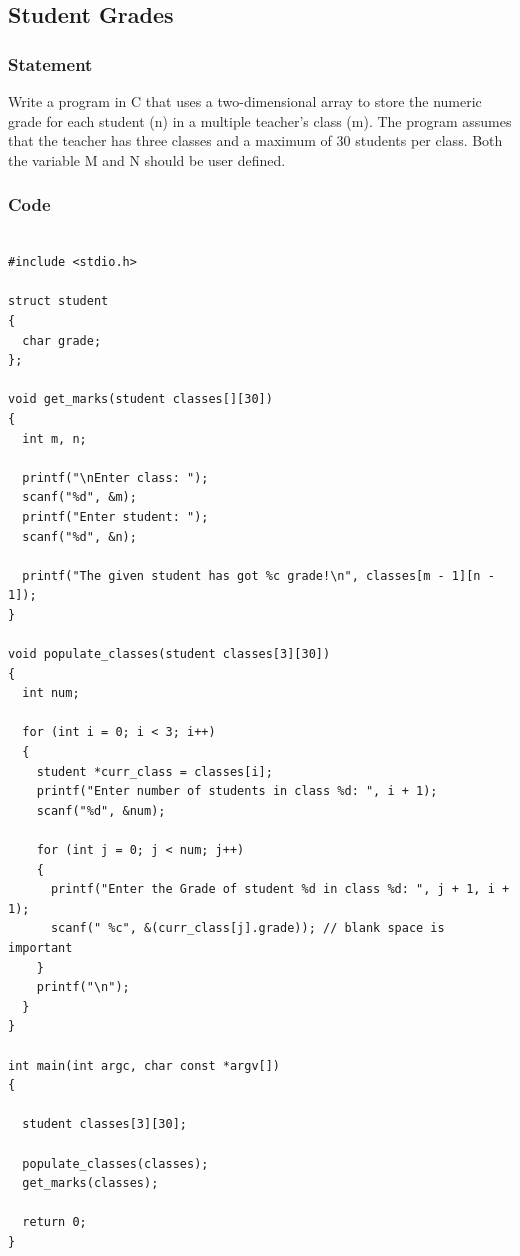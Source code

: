 \subsection{Student Grades}

\subsubsection{Statement}
Write a program in C that uses a two-dimensional array to store the numeric grade for
each student (n) in a multiple teacher’s class (m). The program assumes that the teacher has three
classes and a maximum of 30 students per class. Both the variable M and N should be user
defined.

\subsubsection{Code}
\begin{verbatim} 
 
#include <stdio.h>

struct student
{
  char grade;
};

void get_marks(student classes[][30])
{
  int m, n;

  printf("\nEnter class: ");
  scanf("%d", &m);
  printf("Enter student: ");
  scanf("%d", &n);

  printf("The given student has got %c grade!\n", classes[m - 1][n - 1]);
}

void populate_classes(student classes[3][30])
{
  int num;

  for (int i = 0; i < 3; i++)
  {
    student *curr_class = classes[i];
    printf("Enter number of students in class %d: ", i + 1);
    scanf("%d", &num);

    for (int j = 0; j < num; j++)
    {
      printf("Enter the Grade of student %d in class %d: ", j + 1, i + 1);
      scanf(" %c", &(curr_class[j].grade)); // blank space is important
    }
    printf("\n");
  }
}

int main(int argc, char const *argv[])
{

  student classes[3][30];

  populate_classes(classes);
  get_marks(classes);

  return 0;
}

\end{verbatim}

